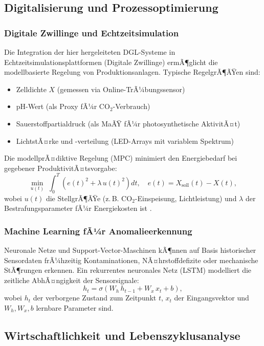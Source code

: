 ﻿\documentclass[a4paper,12pt]{article}
\theoremstyle{definition}
\begin{document}
\subsection{Digitalisierung und Prozessoptimierung}

\subsubsection{Digitale Zwillinge und Echtzeitsimulation}

Die Integration der hier hergeleiteten DGL-Systeme in Echtzeitsimulationsplattformen
(Digitale Zwillinge) ermÃ¶glicht die modellbasierte Regelung von Produktionsanlagen.
Typische RegelgrÃ¶ÃŸen sind:
\begin{itemize}
	\item Zelldichte $X$ (gemessen via Online-TrÃ¼bungssensor)
	\item pH-Wert (als Proxy fÃ¼r CO$_2$-Verbrauch)
	\item Sauerstoffpartialdruck (als MaÃŸ fÃ¼r photosynthetische AktivitÃ¤t)
	\item LichtstÃ¤rke und -verteilung (LED-Arrays mit variablem Spektrum)
\end{itemize}
Die modellprÃ¤diktive Regelung (MPC) minimiert den Energiebedarf bei
gegebener ProduktivitÃ¤tsvorgabe:
\[
	\min_{u(t)}\; \int_0^T \left(e(t)^2 + \lambda\,u(t)^2\right)dt,\quad
	e(t) = X_\mathrm{soll}(t) - X(t),
\]
wobei $u(t)$ die StellgrÃ¶ÃŸe (z.\,B. CO$_2$-Einspeisung, Lichtleistung) und
$\lambda$ der Bestrafungsparameter fÃ¼r Energiekosten ist \cite{posten2009}.

\subsubsection{Machine Learning fÃ¼r Anomalieerkennung}

Neuronale Netze und Support-Vector-Maschinen kÃ¶nnen auf Basis historischer
Sensordaten frÃ¼hzeitig Kontaminationen, NÃ¤hrstoffdefizite oder mechanische
StÃ¶rungen erkennen. Ein rekurrentes neuronales Netz (LSTM) modelliert die
zeitliche AbhÃ¤ngigkeit der Sensorsignale:
\[
	h_t = \sigma(W_h\,h_{t-1} + W_x\,x_t + b),
\]
wobei $h_t$ der verborgene Zustand zum Zeitpunkt $t$, $x_t$ der Eingangsvektor
und $W_h, W_x, b$ lernbare Parameter sind.

\subsection{Wirtschaftlichkeit und Lebenszyklusanalyse}
\end{document}
